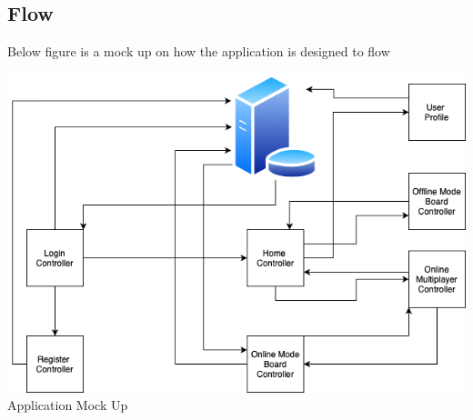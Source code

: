 \documentclass{scrartcl}
\begin{document}
    \subsection{Flow}
        Below figure is a mock up on how the application is designed to flow 
        \begin{center}
        \includegraphics[width=6in]{images/tictacreflexdiagram.png}\\
        \caption{Application Mock Up}
        \end{center}
        ~\newline
        ~\newpage
\end{document}
